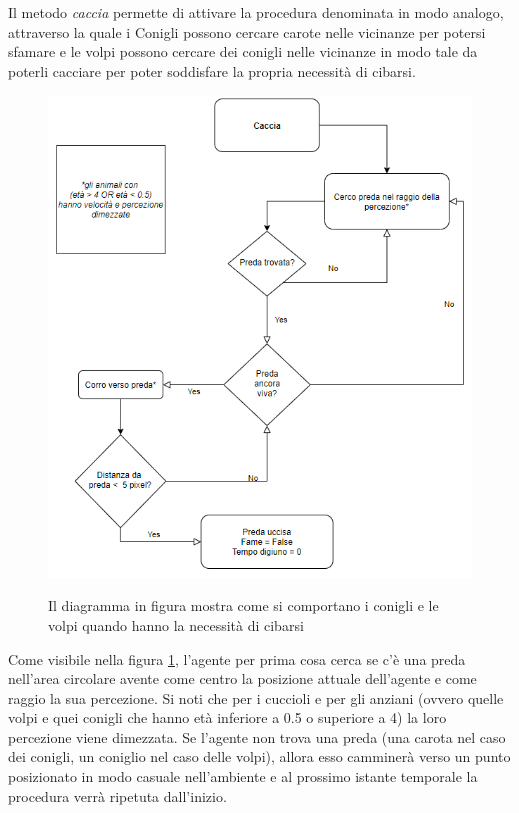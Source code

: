 \documentclass[11pt]{article}
\begin{document}
Il metodo \emph{caccia} permette di attivare la procedura denominata in modo analogo, attraverso la quale i Conigli possono cercare carote nelle vicinanze per potersi sfamare e le volpi possono cercare dei conigli nelle vicinanze in modo tale da poterli cacciare per poter soddisfare la propria necessità di cibarsi.
\begin{figure}
     \centering
     \includegraphics[scale = 0.7]{Caccia.png}
     \label{fig:diagrammaCaccia}
     \caption{Il diagramma in figura mostra come si comportano i conigli e le volpi quando hanno la necessità di cibarsi}
\end{figure}
Come visibile nella figura \ref{fig:diagrammaCaccia}, l'agente per prima cosa cerca se c'è una preda nell'area circolare avente come centro la posizione attuale dell'agente e come raggio la sua percezione. Si noti che per i cuccioli e per gli anziani (ovvero quelle volpi e quei conigli che hanno età inferiore a 0.5 o superiore a 4) la loro percezione viene dimezzata. Se l'agente non trova una preda (una carota nel caso dei conigli, un coniglio nel caso delle volpi), allora esso camminerà verso un punto posizionato in modo casuale nell'ambiente e al prossimo istante temporale la procedura verrà ripetuta dall'inizio. 
\end{document}
